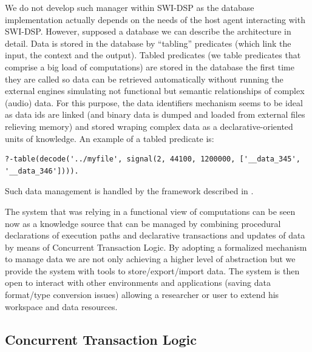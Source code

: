\documentclass[runningheads]{llncs}
\begin{document}
We do not develop such manager within SWI-DSP as the database implementation actually depends on the needs of the host agent interacting with SWI-DSP. However, supposed a database we can describe the architecture in detail. Data is stored in the database by ``tabling'' predicates (which link the input, the context and the output). Tabled predicates (we table predicates that comprise a big load of computations) are stored in the database the first time they are called so data can be retrieved automatically without running the external engines simulating not functional but semantic relationships of complex (audio) data. For this purpose, the data identifiers mechanism seems to be ideal as data ids are linked (and binary data is dumped and loaded from external files relieving memory) and stored wraping complex data as a declarative-oriented units of knowledge. An example of a tabled predicate is:

\begin{verbatim}
?-table(decode('../myfile', signal(2, 44100, 1200000, ['__data_345', '__data_346']))).
\end{verbatim}

Such data management is handled by the framework described in \cite{UsAES2006}.

The system that was relying in a functional view of computations can be seen now as a knowledge source that can be managed by combining procedural declarations of execution paths and declarative transactions and updates of data by means of Concurrent Transaction Logic. By adopting a formalized mechanism to manage data we are not only achieving a higher level of abstraction but we provide the system with tools to store/export/import data. The system is then open to interact with other environments and applications (saving data format/type conversion issues) allowing a researcher or user to extend his workspace and data resources.


\subsection{Concurrent Transaction Logic}\label{sec:ctl}
\end{document}
